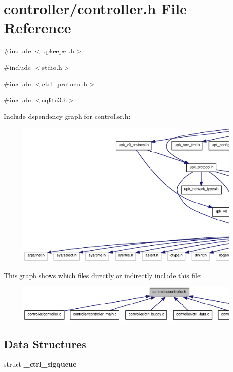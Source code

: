 \section{controller/controller.h File Reference}
\label{controller_8h}
{\ttfamily \#include $<$upkeeper.h$>$}\par
{\ttfamily \#include $<$stdio.h$>$}\par
{\ttfamily \#include $<$ctrl\_\-protocol.h$>$}\par
{\ttfamily \#include $<$sqlite3.h$>$}\par
Include dependency graph for controller.h:\nopagebreak
\begin{figure}[H]
\begin{center}
\leavevmode
\includegraphics[width=400pt]{controller_8h__incl}
\end{center}
\end{figure}
This graph shows which files directly or indirectly include this file:
\nopagebreak
\begin{figure}[H]
\begin{center}
\leavevmode
\includegraphics[width=400pt]{controller_8h__dep__incl}
\end{center}
\end{figure}
\subsection*{Data Structures}
\begin{DoxyCompactItemize}
\item 
struct {\bf \_\-ctrl\_\-sigqueue}
\end{DoxyCompactItemize}
